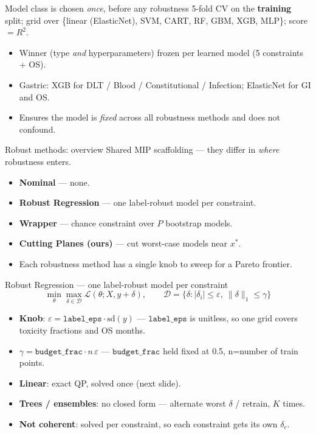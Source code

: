\documentclass{beamer}
\begin{document}
\begin{frame}{Model class is chosen \emph{once}, before any robustness}
  \small
  5-fold CV on the \textbf{training} split; grid over
  \{linear (ElasticNet), SVM, CART, RF, GBM, XGB, MLP\}; score $=R^2$.
  \begin{itemize}
    \item Winner (type \emph{and} hyperparameters) frozen per learned model
      (5 constraints + OS).
    \item Gastric: XGB for DLT / Blood / Constitutional / Infection; ElasticNet for GI and OS.
    \item Ensures the model is \emph{fixed} across all robustness methods and does not confound.
  \end{itemize}
\end{frame}

\begin{frame}{Robust methods: overview}
  Shared MIP scaffolding --- they differ in \emph{where} robustness enters.
  \begin{itemize}
    \item \textbf{Nominal} --- none.
    \item \textbf{Robust Regression} --- one label-robust model per constraint.
    \item \textbf{Wrapper} --- chance constraint over $P$ bootstrap models.
    \item \textbf{Cutting Planes (ours)} --- cut worst-case models near $x^\ast$.
    \item Each robustness method has a single knob to sweep for a Pareto frontier.
  \end{itemize}
\end{frame}

\begin{frame}{Robust Regression --- one label-robust model per constraint}
  \[
    \min_\theta \max_{\delta\in\mathcal D} \mathcal L(\theta; X, y+\delta), \qquad
    \mathcal D = \{\delta : |\delta_i|\le\varepsilon,\ \lVert\delta\rVert_1\le\gamma\}
  \]
  \begin{itemize}
    \item \textbf{Knob}: $\varepsilon = \texttt{label\_eps}\cdot\mathrm{sd}(y)$ ---
      $\texttt{label\_eps}$ is unitless, so one grid covers toxicity fractions and OS months.
    \item $\gamma = \texttt{budget\_frac}\cdot n\,\varepsilon$ --- $\texttt{budget\_frac}$
    held fixed at 0.5, n=number of train points.
    \item \textbf{Linear}: exact QP, solved once (next slide).
    \item \textbf{Trees / ensembles}: no closed form --- alternate worst $\delta$ /
      retrain, $K$ times.
    \item \textbf{Not coherent}: solved per constraint, so each constraint gets its own
      $\delta_c$.
  \end{itemize}
\end{frame}
\end{document}
